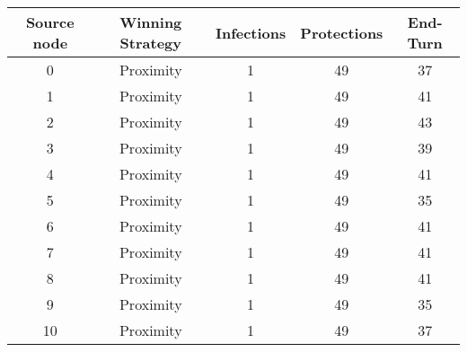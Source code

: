 \documentclass[results.tex]{subfiles}
\begin{document}
    \begin{center}
        \begin{tabular}{| c || c | c | c | c |}
            \hline
            {\bfseries Source node} & {\bfseries Winning Strategy} & {\bfseries Infections} & {\bfseries Protections}
            & {\bfseries End-Turn}
            \\  %
            \hline\hline
            0                       & Proximity                    & 1                      & 49                      & 37                   \\
            \hline
            1                       & Proximity                    & 1                      & 49                      & 41                   \\
            \hline
            2                       & Proximity                    & 1                      & 49                      & 43                   \\
            \hline
            3                       & Proximity                    & 1                      & 49                      & 39                   \\
            \hline
            4                       & Proximity                    & 1                      & 49                      & 41                   \\
            \hline
            5                       & Proximity                    & 1                      & 49                      & 35                   \\
            \hline
            6                       & Proximity                    & 1                      & 49                      & 41                   \\
            \hline
            7                       & Proximity                    & 1                      & 49                      & 41                   \\
            \hline
            8                       & Proximity                    & 1                      & 49                      & 41                   \\
            \hline
            9                       & Proximity                    & 1                      & 49                      & 35                   \\
            \hline
            10                      & Proximity                    & 1                      & 49                      & 37                   \\

\end{tabular}
\end{center}
\end{document}
